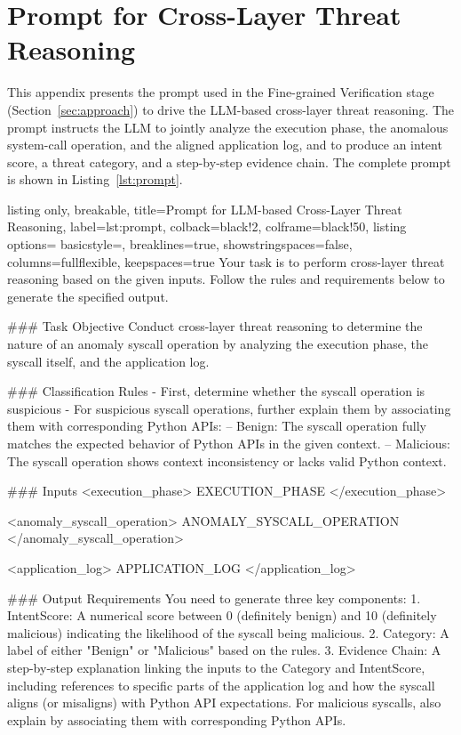 \appendices
\section{Prompt for Cross-Layer Threat Reasoning}\label{appendix:prompt}

This appendix presents the prompt used in the Fine-grained Verification stage (Section~\ref{sec:approach}) to drive the LLM-based cross-layer threat reasoning. The prompt instructs the LLM to jointly analyze the execution phase, the anomalous system-call operation, and the aligned application log, and to produce an intent score, a threat category, and a step-by-step evidence chain. The complete prompt is shown in Listing~\ref{lst:prompt}.

\begin{tcblisting}{listing only,
  breakable,
  title={Prompt for LLM-based Cross-Layer Threat Reasoning},
  label={lst:prompt},
  colback=black!2,
  colframe=black!50,
  listing options={
    basicstyle=\small\ttfamily,
    breaklines=true,
    showstringspaces=false,
    columns=fullflexible,
    keepspaces=true
  }
}
Your task is to perform cross-layer threat reasoning based on the given inputs. Follow the rules and requirements below to generate the specified output.

### Task Objective
Conduct cross-layer threat reasoning to determine the nature of an anomaly syscall operation by analyzing the execution phase, the syscall itself, and the application log.

### Classification Rules
- First, determine whether the syscall operation is suspicious
- For suspicious syscall operations, further explain them by associating them with corresponding Python APIs:
-- Benign: The syscall operation fully matches the expected behavior of Python APIs in the given context.
-- Malicious: The syscall operation shows context inconsistency or lacks valid Python context.

### Inputs
<execution_phase>
{{EXECUTION_PHASE}}
</execution_phase>

<anomaly_syscall_operation>
{{ANOMALY_SYSCALL_OPERATION}}
</anomaly_syscall_operation>

<application_log>
{{APPLICATION_LOG}}
</application_log>

### Output Requirements
You need to generate three key components:
1. IntentScore: A numerical score between 0 (definitely benign) and 10 (definitely malicious) indicating the likelihood of the syscall being malicious.
2. Category: A label of either "Benign" or "Malicious" based on the rules.
3. Evidence Chain: A step-by-step explanation linking the inputs to the Category and IntentScore, including references to specific parts of the application log and how the syscall aligns (or misaligns) with Python API expectations. For malicious syscalls, also explain by associating them with corresponding Python APIs.


\end{tcblisting}
